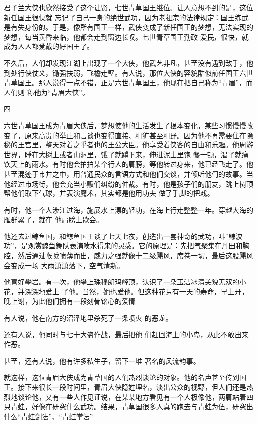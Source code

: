 \documentclass{article}
\begin{document}
君子兰大侠也欣然接受了这个让贤，七世青草国王继位。让人意想不到的是，这位新任国王很快就
\newpage
忘记了自己一身的绝世武功，因为老祖宗的法律规定：国王练武是有失身份的。于是，像所有国王一样，武侠变成了新任国王的梦想，无法实现的梦想，每当黄昏来临，他都会走到窗边长叹。七世青草国王勤政
爱民，很快，就成为人人都爱戴的好国王了。 

不久后，人们却发现江湖上出现了一个大侠，他武艺非凡，甚至没有遇到敌手，他到处行侠仗义，锄强扶弱，飞檐走壁。有人说，那位大侠的容貌酷似前任国王六世青草国王。那人说得一点不错，正是六世青草国王，他现在把自己称为“青眉”，而人们则
称他为“青眉大侠”。 


四 

六世青草国王成为青眉大侠后，梦想使他的生活发生了根本变化，某些习惯慢慢改变了，原来高贵的举止和言谈也变得直接、粗犷甚至粗野。因为他不再需要住在隐秘的王宫里，整天对着之乎者也的王公大臣。他享受着侠客的自由和乐趣。他周游世界，睡在大树上或者山洞里，饿了就蹲下来，伸进泥土里饱
\newpage
餐一顿，渴了就痛饮天上的雨水。有时他会拍拍某个行人的肩膀，等他转过身来，他已经飞走了。他甚至混迹于市井之中，用普通民众的言语方式和他们交谈，并倾听他们的故事。当他经过市场街，他会充当小贩们纠纷的仲裁。有时，他是孩子们的朋友，跳上树顶帮他们取下气球，并表演魔术，其实都是他用功夫
做了手脚的把戏。 

有时，他一个人涉江过海，施展水上漂的轻功，在海上行走整整一年。穿越大海的雁群累了，就在
他肩膀上歇会。 

他还去过鲸鱼国，和鲸鱼国王谈了七天七夜，创造出一套神奇的武功，叫“鲸波功”，是观赏鲸鱼舞队表演喷水得来的灵感。它的原理是：先把气聚集在丹田和胸腔，然后通过喉咙喷薄而出，威力之强就像十二级飓风，席卷一切，最后这股飓风会变成一场
大雨潇潇落下，空气清新。 

他喜好攀岩。有一次，他攀上珠穆朗玛峰顶，认识了一朵玉洁冰清美貌无双的小花，并深深地爱上
\newpage
了他。当然，她也爱他。但这种花只有一天的寿命，早上开，晚上谢，为此他们拥有一段刻骨铭心的爱情

有人说，他在南方的沼泽地里杀死了一条喷火
的恶龙。 

还有人说，他同时与七十大盗作战，最后把他
们赶回海上的小岛，从此不敢出来作恶。 

甚至，还有人说，他有许多私生子，留下一堆
著名的风流韵事。 

就这样，这位青眉大侠成为青草国的人们热烈谈论的对象。他的名声甚至传到国王。接下来很长一段时间里，青眉大侠隐姓埋名，淡出公众的视野，但人们还是热烈地谈论他，又有一些人作见证说，在某某地方看见有一个人极像他，两肩站着四只青蛙，好像在研究什么武功。结果，青草国很多人真的跑去与青蛙为伍，研究出什么“青蛙剑法”、“青蛙掌法”
\end{document}
